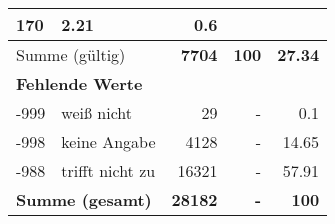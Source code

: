 \begin{longtable}{lXrrr}
       \num{170} &
       \num[round-mode=places,round-precision=2]{2,21} &
         \num[round-mode=places,round-precision=2]{0,6} \\
     \midrule
     \multicolumn{2}{l}{Summe (gültig)} &
       \textbf{\num{7704}} &
     \textbf{100} &
       \textbf{\num[round-mode=places,round-precision=2]{27,34}} \\
     \multicolumn{5}{l}{\textbf{Fehlende Werte}}\\
       -999 &
       weiß nicht &
         \num{29} &
        - &
         \num[round-mode=places,round-precision=2]{0,1} \\
       -998 &
       keine Angabe &
         \num{4128} &
        - &
         \num[round-mode=places,round-precision=2]{14,65} \\
       -988 &
       trifft nicht zu &
         \num{16321} &
        - &
         \num[round-mode=places,round-precision=2]{57,91} \\
     \midrule
     \multicolumn{2}{l}{\textbf{Summe (gesamt)}} &
          \textbf{\num{28182}} &
        \textbf{-} &
        \textbf{100} \\
     \bottomrule
     \end{longtable}
     
